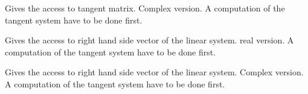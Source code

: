 \documentclass[a4paper,11pt,english]{sphinxmanual}
\begin{document}

\begin{fulllineitems}
\label{\detokenize{userdoc/model_object:_CPPv4N6getfem5model22complex_tangent_matrixEv}}%
\pysigstartmultiline
{}%
\pysigstopmultiline
Gives the access to tangent matrix. Complex version. A computation of the
tangent system have to be done first.

\end{fulllineitems}


\begin{fulllineitems}
\label{\detokenize{userdoc/model_object:_CPPv4N6getfem5model8real_rhsEv}}%
\pysigstartmultiline
{}%
\pysigstopmultiline
Gives the access to right hand side vector of the linear system. real version.
A computation of the tangent system have to be done first.

\end{fulllineitems}


\begin{fulllineitems}
\label{\detokenize{userdoc/model_object:_CPPv4N6getfem5model11complex_rhsEv}}%
\pysigstartmultiline
{}%
\pysigstopmultiline
Gives the access to right hand side vector of the linear system. Complex
version. A computation of the tangent system have to be done first.

\end{fulllineitems}
\end{document}
